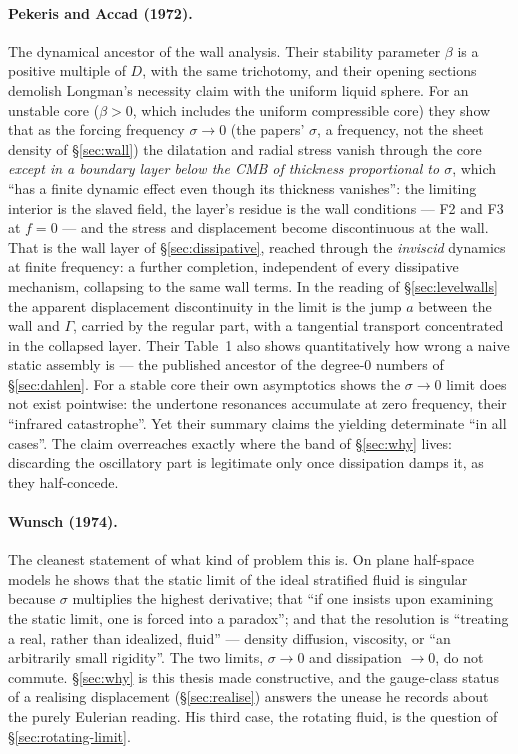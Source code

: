 \documentclass[11pt]{article}
\theoremstyle{definition}
\theoremstyle{remark}
\begin{document}
\paragraph{Pekeris and Accad (1972).} The dynamical ancestor of the
wall analysis. Their stability parameter $\beta$ is a positive
multiple of $D$, with the same trichotomy, and their opening sections
demolish Longman's necessity claim with the uniform liquid sphere. For
an unstable core ($\beta > 0$, which includes the uniform compressible
core) they show that as the forcing frequency $\sigma \to 0$ (the
papers' $\sigma$, a frequency, not the sheet density of
\S\ref{sec:wall}) the
dilatation and radial stress vanish through the core \emph{except in a
boundary layer below the CMB of thickness proportional to $\sigma$},
which ``has a finite dynamic effect even though its thickness
vanishes'': the limiting interior is the slaved field, the layer's
residue is the wall conditions --- F2 and F3 at $f = 0$ --- and the
stress and displacement become discontinuous at the wall. That is the
wall layer of \S\ref{sec:dissipative}, reached through the
\emph{inviscid} dynamics at finite frequency: a further completion,
independent of every dissipative mechanism, collapsing to the same
wall terms. In the reading of \S\ref{sec:levelwalls} the apparent
displacement discontinuity in the limit is the jump $a$ between the
wall and $\Gamma$, carried by the regular part, with a tangential
transport concentrated in the collapsed layer. Their Table~1 also shows quantitatively how wrong a naive
static assembly is --- the published ancestor of the degree-0 numbers
of \S\ref{sec:dahlen}. For a stable core their own asymptotics shows
the $\sigma \to 0$ limit does not exist pointwise: the undertone
resonances accumulate at zero frequency, their ``infrared
catastrophe''. Yet their summary claims the yielding determinate ``in
all cases''. The claim overreaches exactly where the band of
\S\ref{sec:why} lives: discarding the oscillatory part is legitimate
only once dissipation damps it, as they half-concede.

\paragraph{Wunsch (1974).} The cleanest statement of what kind of
problem this is. On plane half-space models he shows that the static
limit of the ideal stratified fluid is singular because $\sigma$
multiplies the highest derivative; that ``if one insists upon
examining the static limit, one is forced into a paradox''; and that
the resolution is ``treating a real, rather than idealized, fluid''
--- density diffusion, viscosity, or ``an arbitrarily small
rigidity''. The two limits, $\sigma \to 0$ and dissipation $\to 0$, do
not commute. \S\ref{sec:why} is this thesis made constructive, and the
gauge-class status of a realising displacement
(\S\ref{sec:realise}) answers the unease he records about the purely
Eulerian reading. His third case, the rotating fluid, is the question
of \S\ref{sec:rotating-limit}.
\end{document}
